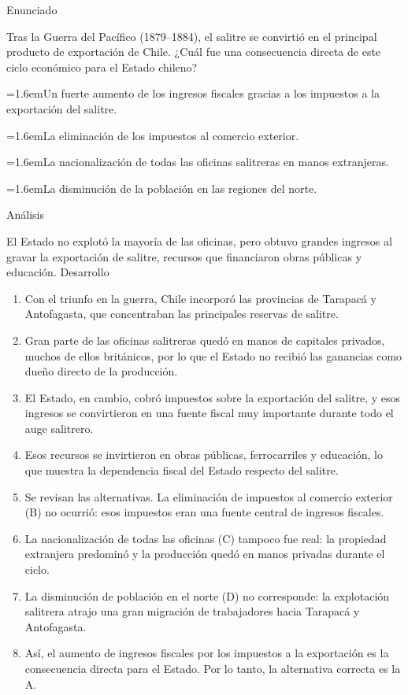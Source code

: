 \documentclass[10pt,a4paper,twocolumn]{article}
\newcommand{\alternativa}[2]{\par\noindent\hangindent=1.6em\hangafter=1\makebox[1.6em][l]{\tecla{#1}}#2\par}
\newcommand{\clave}[1]{\par\smallskip{\sffamily\footnotesize\color{esmeralda} Clave \teclaok{#1}}\par}
\begin{document}
\begin{ejemplo}
{\sffamily\footnotesize\color{zinc500} Enunciado}\par
Tras la Guerra del Pacífico (1879–1884), el salitre se convirtió en el principal producto de exportación de Chile. ¿Cuál fue una consecuencia directa de este ciclo económico para el Estado chileno?
\alternativa{A}{Un fuerte aumento de los ingresos fiscales gracias a los impuestos a la exportación del salitre.}
\alternativa{B}{La eliminación de los impuestos al comercio exterior.}
\alternativa{C}{La nacionalización de todas las oficinas salitreras en manos extranjeras.}
\alternativa{D}{La disminución de la población en las regiones del norte.}
\clave{A}
{\sffamily\footnotesize\color{zinc500} Análisis}\par El Estado no explotó la mayoría de las oficinas, pero obtuvo grandes ingresos al gravar la exportación de salitre, recursos que financiaron obras públicas y educación.
{\sffamily\footnotesize\color{zinc500} Desarrollo}
\begin{enumerate}
  \item Con el triunfo en la guerra, Chile incorporó las provincias de Tarapacá y Antofagasta, que concentraban las principales reservas de salitre.
  \item Gran parte de las oficinas salitreras quedó en manos de capitales privados, muchos de ellos británicos, por lo que el Estado no recibió las ganancias como dueño directo de la producción.
  \item El Estado, en cambio, cobró impuestos sobre la exportación del salitre, y esos ingresos se convirtieron en una fuente fiscal muy importante durante todo el auge salitrero.
  \item Esos recursos se invirtieron en obras públicas, ferrocarriles y educación, lo que muestra la dependencia fiscal del Estado respecto del salitre.
  \item Se revisan las alternativas. La eliminación de impuestos al comercio exterior (B) no ocurrió: esos impuestos eran una fuente central de ingresos fiscales.
  \item La nacionalización de todas las oficinas (C) tampoco fue real: la propiedad extranjera predominó y la producción quedó en manos privadas durante el ciclo.
  \item La disminución de población en el norte (D) no corresponde: la explotación salitrera atrajo una gran migración de trabajadores hacia Tarapacá y Antofagasta.
  \item Así, el aumento de ingresos fiscales por los impuestos a la exportación es la consecuencia directa para el Estado. Por lo tanto, la alternativa correcta es la A.
\end{enumerate}
\end{ejemplo}
\end{document}
